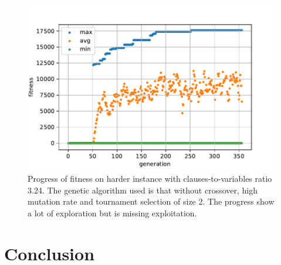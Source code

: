 \documentclass{article}
\begin{document}
\begin{figure}[ht]
\vskip 0.2in
\begin{center}
\centerline{\includegraphics[width=\columnwidth]{figs/mutation-progress}}
\caption{Progress of fitness on harder instance with clauses-to-variables
ratio 3.24. The genetic algorithm used is that without crossover,
high mutation rate and tournament selection of size 2.
The progress show a lot of exploration but is missing exploitation.}
\label{mutation-progress}
\end{center}
\vskip -0.2in
\end{figure}

\section{Conclusion}




\end{document}
